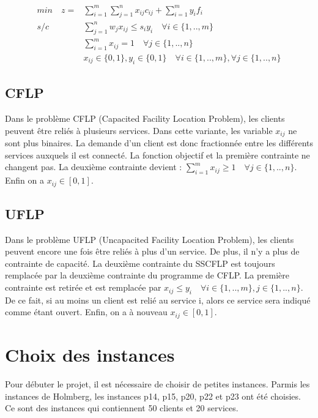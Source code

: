 \begin{align}
min \quad z = &\sum\limits_{i=1}^m \sum\limits_{j=1}^n x_{ij}c_{ij} + \sum\limits_{i=1}^m y_i f_i \\
  s/c \quad &\sum\limits_{j=1}^n w_j x_{ij} \leq s_i y_i \quad \forall i \in \{1, .., m\} \\
            &\sum\limits_{i=1}^m x_{ij} = 1 \quad \forall j \in \{1, .., n\} \\
            &x_{ij} \in \{0,1\}, y_i \in \{0,1\} \quad \forall i \in \{1,..,m\}, \forall j \in \{1,..,n\}
\end{align}

\subsection{CFLP}

Dans le problème CFLP (Capacited Facility Location Problem), les clients peuvent être reliés à plusieurs services. Dans cette variante, les variable $x_{ij}$ ne sont plus binaires. La demande d'un client est donc fractionnée entre les différents services auxquels il est connecté. La fonction objectif et la première contrainte ne changent pas. La deuxième contrainte devient :
$ \sum \limits_{i=1}^m x_{ij} \geq 1 \quad \forall j \in \{1,..,n\}$.
Enfin on a $x_{ij} \in [0,1]$.

\subsection {UFLP}

Dans le problème UFLP (Uncapacited Facility Location Problem), les clients peuvent encore une fois être reliés à plus d'un service. De plus, il n'y a plus de contrainte de capacité.
La deuxième contrainte du SSCFLP est toujours remplacée par la deuxième contrainte du programme de CFLP.
La première contrainte est retirée et est remplacée par
$ x_{ij} \leq y_i \quad \forall i \in \{1,..,m\}, j \in \{1,..,n\}$.
De ce fait, si au moins un client est relié au service i, alors ce service sera indiqué comme étant ouvert.
Enfin, on a à nouveau $x_{ij} \in [0,1]$.


\section{Choix des instances}

Pour débuter le projet, il est nécessaire de choisir de petites instances.
Parmis les instances de Holmberg, les instances p14, p15, p20, p22 et p23 ont été choisies.
Ce sont des instances qui contiennent 50 clients et 20 services. \newline

